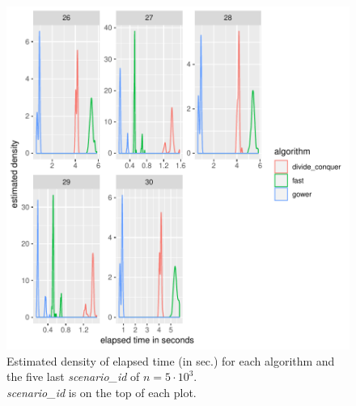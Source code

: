 \documentclass[11pt]{report}
\begin{document}
\begin{figure}[h]
\centering
    \includegraphics[scale=2]{./images/elapsed_time_5000_part2.pdf}
    \caption{
    Estimated density of elapsed time (in sec.) for each algorithm and the five 
    last \textit{scenario\_id} of $n=5 \cdot 10^3$.\\
    \textit{scenario\_id} is on the top of each plot.
    }
\end{figure}

\FloatBarrier
\end{document}
